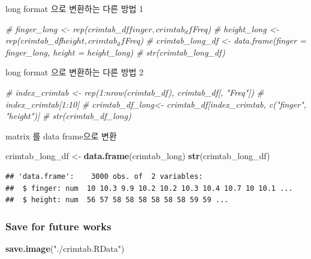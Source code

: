 \documentclass[
]{article}
\newenvironment{Shaded}{\begin{snugshade}}{\end{snugshade}}
\newcommand{\CommentTok}[1]{\textcolor[rgb]{0.56,0.35,0.01}{\textit{#1}}}
\newcommand{\KeywordTok}[1]{\textcolor[rgb]{0.13,0.29,0.53}{\textbf{#1}}}
\newcommand{\NormalTok}[1]{#1}
\newcommand{\StringTok}[1]{\textcolor[rgb]{0.31,0.60,0.02}{#1}}
\begin{document}
long format 으로 변환하는 다른 방법 1

\begin{Shaded}
\begin{Highlighting}[]
\CommentTok{# finger_long <- rep(crimtab_df$finger, crimtab_df$Freq)}
\CommentTok{# height_long <- rep(crimtab_df$height, crimtab_df$Freq)}
\CommentTok{# crimtab_long_df <- data.frame(finger = finger_long, height = height_long)}
\CommentTok{# str(crimtab_long_df)}
\end{Highlighting}
\end{Shaded}

long format 으로 변환하는 다른 방법 2

\begin{Shaded}
\begin{Highlighting}[]
\CommentTok{# index_crimtab <- rep(1:nrow(crimtab_df), crimtab_df[, "Freq"])}
\CommentTok{# index_crimtab[1:10]}
\CommentTok{# crimtab_df_long<- crimtab_df[index_crimtab, c("finger", "height")]}
\CommentTok{# str(crimtab_df_long)}
\end{Highlighting}
\end{Shaded}

matrix 를 data frame으로 변환

\begin{Shaded}
\begin{Highlighting}[]
\NormalTok{crimtab_long_df <-}\StringTok{ }\KeywordTok{data.frame}\NormalTok{(crimtab_long)}
\KeywordTok{str}\NormalTok{(crimtab_long_df)}
\end{Highlighting}
\end{Shaded}

\begin{verbatim}
## 'data.frame':    3000 obs. of  2 variables:
##  $ finger: num  10 10.3 9.9 10.2 10.2 10.3 10.4 10.7 10 10.1 ...
##  $ height: num  56 57 58 58 58 58 58 58 59 59 ...
\end{verbatim}

\hypertarget{save-for-future-works}{%
\subsubsection{Save for future works}\label{save-for-future-works}}

\begin{Shaded}
\begin{Highlighting}[]
\KeywordTok{save.image}\NormalTok{(}\StringTok{"./crimtab.RData"}\NormalTok{)}
\end{Highlighting}
\end{Shaded}
\end{document}
